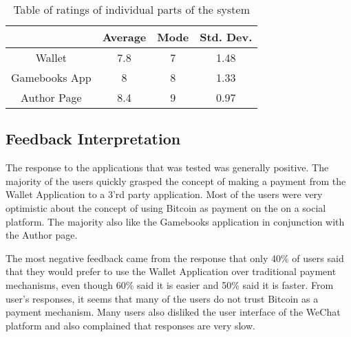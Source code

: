 \begin{table}
	\begin{center}
		\begin{tabular}	{ | c| c | c | c|}
		\hline
		 &Average & Mode & Std. Dev. \\ \hline
		 Wallet & 7.8 & 7 & 1.48 \\ \hline
		 Gamebooks App& 8 & 8 & 1.33\\ \hline
		 Author Page & 8.4 & 9 & 0.97\\ \hline

		
		
		\end{tabular}
		\caption{Table of ratings of individual parts of the system} 
		\label{tbl:ratings}
	\end{center}
\end{table}


\subsection{Feedback Interpretation}

The response to the applications that was tested was generally positive. The majority of the users quickly grasped the concept of making a payment from the Wallet Application to a 3'rd party application. Most of the users were very optimistic about the concept of using Bitcoin as payment on the on a social platform. The majority also like the Gamebooks application in conjunction with the Author page. 

The most negative feedback came from the response that only 40\% of users said that they would prefer to use the Wallet Application over traditional payment mechanisms, even though 60\% said it is easier and 50\% said it is faster. From user's responses, it seems that many of the users do not trust Bitcoin as a payment mechanism. Many users also disliked the user interface of the WeChat platform and also complained that responses are very slow.




